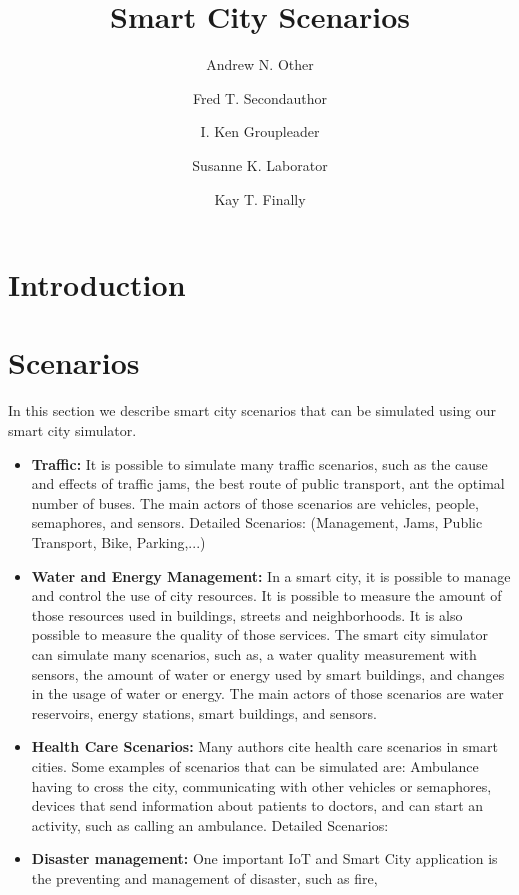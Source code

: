 \documentclass[
journal=jacsat, %
manuscript=article]{achemso}
\author{Andrew N. Other}
\author{Fred T. Secondauthor}
\author{I. Ken Groupleader}
\affiliation[Unknown University]
{Department of Chemistry, Unknown University, Unknown Town}
\author{Susanne K. Laborator}
\affiliation[BigPharma]
{Lead Discovery, BigPharma, Big Town, USA}
\author{Kay T. Finally}
\affiliation[Unknown University]
{Department of Chemistry, Unknown University, Unknown Town}
\title[\texttt{achemso} demonstration]
{Smart City Scenarios}
\begin{document}
\begin{abstract}

\end{abstract}

\section{Introduction}

\section{Scenarios}

In this section we describe smart city scenarios that can be simulated using our smart city simulator.

\begin{itemize}
\item \textbf{Traffic:} It is possible to simulate many traffic scenarios, such as the cause and effects of traffic jams, the best route of public transport, ant the optimal number of buses. The main actors of those scenarios are vehicles, people, semaphores, and sensors.
Detailed Scenarios:
(Management, Jams, Public Transport, Bike, Parking,...)

\item \textbf{Water and Energy Management:} In a smart city, it is possible to manage and control the use of city resources. It is possible to measure the amount of those resources used in buildings, streets and neighborhoods. It is also possible to measure the quality of those services. The smart city simulator can simulate many scenarios, such as, a water quality measurement with sensors, the amount of water or energy used by smart buildings, and changes in the usage of water or energy. The main actors of those scenarios are water reservoirs, energy stations, smart buildings, and sensors.


\item \textbf{Health Care Scenarios:} Many authors cite health care scenarios in smart cities. Some examples of scenarios that can be simulated are: Ambulance having to cross the city, communicating with other vehicles or semaphores, devices that send information about patients to doctors, and can start an activity, such as  calling an ambulance.
Detailed Scenarios:

\item \textbf{Disaster management:} One important IoT and Smart City application is the preventing and management of disaster, such as fire, 


\end{itemize}
\end{document}
